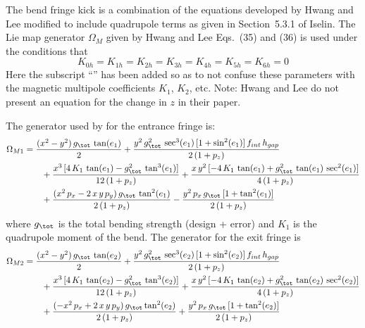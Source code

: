 The bend fringe kick is a combination of the equations developed by Hwang and Lee\cite{b:hwang}
modified to include quadrupole terms as given in Section~5.3.1 of Iselin\cite{b:madphysics}. The
Lie map generator $\Omega_M$ given by Hwang and Lee Eqs.~(35) and (36) is used under the conditions
that
\begin{equation}
  K_{0h} = K_{1h} = K_{2h} = K_{3h} = K_{4h} = K_{5h} = K_{6h} = 0
\end{equation}
Here the subscript ``'' has been added so as to not confuse these parameters with the magnetic
multipole coefficients $K_1$, $K_2$, etc. Note: Hwang and Lee do not present an equation for the
change in $z$ in their paper.

The generator used by \bmad for the entrance fringe is:
\begin{align}
  \Omega_{M1} &= \frac{(x^2 - y^2) \, g_\tot \, \tan (e_1)}{2} 
  + \frac{y^2 \, g_\tot^2 \, \sec^3 (e_1) \, [1 + \sin^2 (e_1)] \, f_{int} \,  h_{gap}}{2 \, (1 + p_z)} \CRNO
  & \qquad + \frac{x^3 \, [4 \, K_1 \, \tan (e_1) - g_\tot^2 \, \tan^3 (e_1)]}{12 \, (1 + p_z)}
  + \frac{x \, y^2 \, [-4 \, K_1 \, \tan (e_1) + g_\tot^2 \, \tan (e_1) \, \sec^2 (e_1)]}{4 \, (1 + p_z)} \\
  &\qquad + \frac{(x^2 \, p_x - 2 \, x \, y \, p_y) \, g_\tot \, \tan^2 (e_1)}{2 \, (1 + p_z)}
  - \frac{y^2 \, p_x \, g_\tot \, [1 + \tan^2 (e_1)]}{2 \, (1 + p_z)} \nonumber
\end{align}
where $g_\tot$ is the total bending strength (design + error) and $K_1$ is the quadrupole moment of the bend.
The generator for the exit fringe is
\begin{align}
  \Omega_{M2} &= \frac{(x^2 - y^2) \, g_\tot \, \tan (e_2)}{2} 
  + \frac{y^2 \, g_\tot^2 \, \sec^3 (e_2) \, [1 + \sin^2 (e_2)] \, f_{int} \,  h_{gap}}{2 \, (1 + p_z)} \CRNO
  &\qquad + \frac{x^3 \, [4 \, K_1 \, \tan (e_2) - g_\tot^2 \, \tan^3 (e_2)]}{12 \, (1 + p_z)}
  + \frac{x \, y^2 \, [-4 \, K_1 \, \tan (e_2) + g_\tot^2 \, \tan (e_2) \, \sec^2 (e_2)]}{4 \, (1+p_z)} \\
  &\qquad + \frac{(-x^2 \, p_x + 2 \, x \, y \, p_y) \, g_\tot \tan^2 (e_2)}{2 \, (1 + p_z)}
  + \frac{y^2 \, p_x \, g_\tot \, [1 + \tan^2 (e_2)]}{2 \, (1 + p_z)} \nonumber
\end{align}

